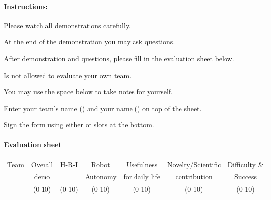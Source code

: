 \paragraph{Instructions:}
\begin{compactenum}
\item Please watch all demonstrations carefully.
\item At the end of the demonstration you may ask questions.
\item After demonstration and questions, please fill in the evaluation sheet below.
\item Is not allowed to evaluate your own team.
\item You may use the space below  to take notes for yourself.
\item Enter your team's name () and your name () on top of the sheet.
\item Sign the form using either  or  slots at the bottom.
\end{compactenum}

\paragraph{Evaluation sheet}
\begin{center}
\begingroup
\newcommand\tableTEAMS{}
\def\do#1{\appto\tableTEAMS{#1 & & & & & &  \\\hline}}%
\expandafter\docsvlist\expandafter{\TEAMSSTAGETWO}
\begin{tabular}{|l|c|c|c|c|c|c|}
  \hline
  \multirow{3}{*}{Team}
  &  Overall &  H-R-I  &  Robot    &  Usefulness    & Novelty/Scientific         & Difficulty \&  \\
  &  demo &    &  Autonomy &  for daily life    & contribution        & Success  \\
  &  (0-10)  &  (0-10) &  (0-10)   & (0-10) & (0-10) & (0-10) \\
  \hline
  \hline
  \tableTEAMS
\end{tabular}
\endgroup
\end{center}

